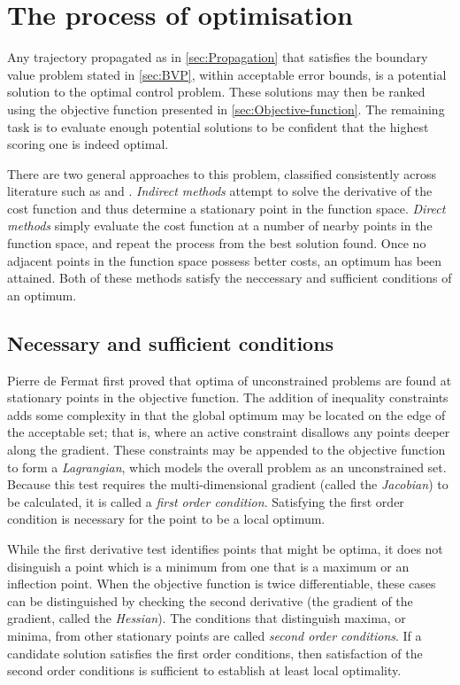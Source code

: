 \section{The process of optimisation} \label{sec:Process}

Any trajectory propagated as in \autoref{sec:Propagation} that satisfies the boundary value problem stated in \autoref{sec:BVP}, within acceptable error bounds, is a potential solution to the optimal control problem. These solutions may then be ranked using the objective function presented in \autoref{sec:Objective-function}. The remaining task is to evaluate enough potential solutions to be confident that the highest scoring one is indeed optimal. 

There are two general approaches to this problem, classified consistently across literature such as \textcite{Betts1998} and \textcite{ASTOS_guide}. \emph{Indirect methods} attempt to solve the derivative of the cost function and thus determine a stationary point in the function space. \emph{Direct methods} simply evaluate the cost function at a number of nearby points in the function space, and repeat the process from the best solution found. Once no adjacent points in the function space possess better costs, an optimum has been attained. Both of these methods satisfy the neccessary and sufficient conditions of an optimum. 

\subsection{Necessary and sufficient conditions} \label{sub:Neccessary-and-sufficient}

Pierre de Fermat first proved that optima of unconstrained problems are found at stationary points in the objective function. The addition of inequality constraints adds some complexity in that the global optimum may be located on the edge of the acceptable set; that is, where an active constraint disallows any points deeper along the gradient. These constraints may be appended to the objective function to form a \emph{Lagrangian}, which models the overall problem as an unconstrained set. Because this test requires the multi-dimensional gradient (called the \emph{Jacobian}) to be calculated, it is called a \emph{first order condition}. Satisfying the first order condition is necessary for the point to be a local optimum.

While the first derivative test identifies points that might be optima, it does not disinguish a point which is a minimum from one that is a maximum or an inflection point. When the objective function is twice differentiable, these cases can be distinguished by checking the second derivative (the gradient of the gradient, called the \emph{Hessian}). The conditions that distinguish maxima, or minima, from other stationary points are called \emph{second order conditions}. If a candidate solution satisfies the first order conditions, then satisfaction of the second order conditions is sufficient to establish at least local optimality.

